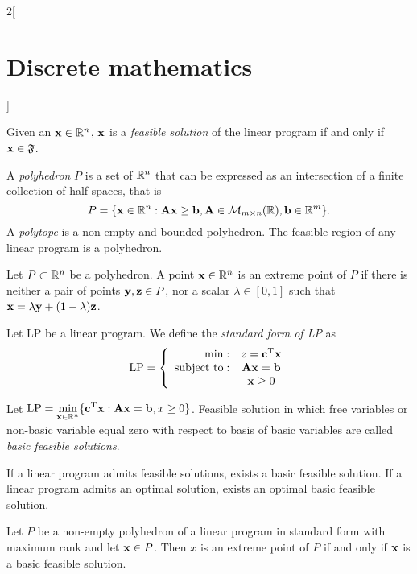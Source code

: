 \documentclass[../../../main.tex]{subfiles}
\begin{document}
\begin{multicols}{2}[\section{Discrete mathematics}]
\begin{definition}
\end{definition}
\begin{prop}
    Given an $\vb{x}\in\mathbb{R} ^n$, $\vb{x}$ is a \textit{feasible solution} of the linear program if and only if $\vb{x}\in\mathfrak{F}$.
\end{prop}
\begin{definition}
A \textit{polyhedron} $P$ is a set of $\mathbb{R} ^n$ that can be expressed as an intersection of a finite collection of half-spaces, that is $$P=\{\vb{x}\in\mathbb{R} ^n:\vb{A}\vb{x}\geq \vb{b}, \vb{A}\in\mathcal{M}_{m\times n}(\mathbb{R} ),\vb{b}\in\mathbb{R} ^m\}.$$ A \textit{polytope} is a non-empty and bounded polyhedron. The feasible region of any linear program is a polyhedron.
\end{definition}
\begin{definition}
Let $P\subset\mathbb{R} ^n$ be a polyhedron. A point $\vb{x}\in\mathbb{R} ^n$ is an extreme point of $P$ if there is neither a pair of points $\vb{y},\vb{z}\in P$, nor a scalar $\lambda\in[0,1]$ such that $\vb{x}=\lambda \vb{y}+(1-\lambda)\vb{z}$.
\end{definition}
\begin{definition}
    Let LP be a linear program. We define the \textit{standard form of LP} as $$\text{LP}=\left\{
    \begin{array}{rc}
        \min: & z=\vb{c}^{\mathrm{T}}\vb{x} \\
        \text{subject to}: & \vb{A}\vb{x}=\vb{b}\\
        & \vb{x}\geq 0
    \end{array}\right.$$
\end{definition}
\begin{definition}
Let $\displaystyle \text{LP}=\min_{\vb{x}\in\mathbb{R} ^n}\{\vb{c}^{\mathrm{T}}\vb{x}:\vb{A}\vb{x}=\vb{b},x\geq 0\}$. Feasible solution in which free variables or non-basic variable equal zero with respect to basis of basic variables are called \textit{basic feasible solutions}.
\end{definition}
\begin{prop}
If a linear program admits feasible solutions, exists a basic feasible solution. If a linear program admits an optimal solution, exists an optimal basic feasible solution.
\end{prop}
\begin{theorem}
Let $P$ be a non-empty polyhedron of a linear program in standard form with maximum rank and let $\vb{x}\in P$. Then $x$ is an extreme point of $P$ if and only if $\vb{x}$ is a basic feasible solution.

\end{theorem}
\end{multicols}
\end{document}
